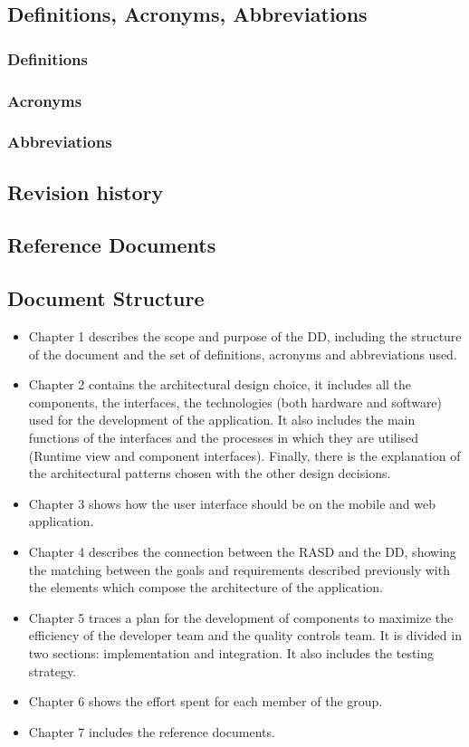 \subsection{Definitions, Acronyms, Abbreviations}
\subsubsection{Definitions}
\subsubsection{Acronyms}
\subsubsection{Abbreviations}
\subsection{Revision history}
\subsection{Reference Documents}
\subsection{Document Structure}
\begin{itemize}
	\item Chapter 1 describes the scope and purpose of the DD, including the structure of the document and the set of definitions, acronyms and abbreviations used.
	\item Chapter 2 contains the architectural design choice, it includes all the components, the interfaces, the technologies (both hardware and software) used for the development of the application. It also
	includes the main functions of the interfaces and the processes in which they are utilised (Runtime view and component interfaces). Finally, there is the explanation of the architectural patterns chosen with the other design decisions.
	\item Chapter 3 shows how the user interface should be on the mobile and web application.
	\item Chapter 4 describes the connection between the RASD and the DD, showing the matching between
the goals and requirements described previously with the elements which compose the
architecture of the application.
	\item Chapter 5 traces a plan for the development of components to maximize the efficiency of the
developer team and the quality controls team. It is divided in two sections: implementation and
integration. It also includes the testing strategy.
	\item Chapter 6 shows the effort spent for each member of the group.
	\item Chapter 7 includes the reference documents.
\end{itemize}